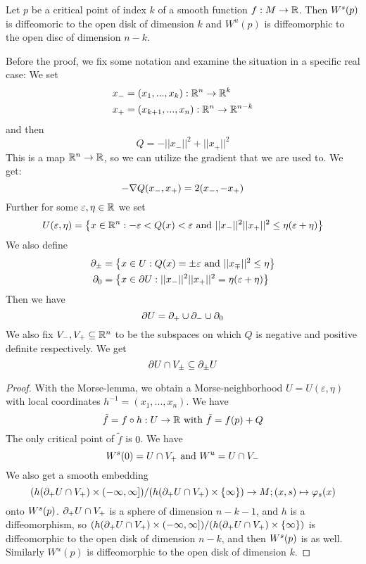 \begin{prop}
    Let $p$ be a critical point of index $k$ of a smooth function $f: M \to { \mathbb R }$. Then
    ${ W^s }(p)$ is diffeomoric to the open disk of dimension $k$ and $W^u(p)$ is diffeomorphic
    to the open disc of dimension $n - k$.
\end{prop}

\begin{definition}
    Before the proof, we fix some notation and examine the situation in a specific real case:
    We set 
    \begin{align*}
        x_- &= (x_1, ..., x_k) : { \mathbb R }^n \to { \mathbb R }^k \\
        x_+ &= (x_{k+1}, ..., x_n): { \mathbb R }^n \to { \mathbb R }^{n - k}
    \end{align*}
    and then
    \[ Q = - || x_- ||^2 + || x_+ ||^2 \]
    This is a map ${ \mathbb R }^n \to { \mathbb R }$, so we can utilize the gradient that we are used to. We get:
    \[ -{ \nabla } Q (x_-, x_+) = 2 (x_-, -x_+) \]
    Further for some $\varepsilon, \eta \in { \mathbb R }$ we set
    \[ U(\varepsilon, \eta) = \left\{ x \in { \mathbb R }^n : - \varepsilon < Q(x) < \varepsilon
    \text{ and } || x_- ||^2 || x_+ ||^2 \leq \eta(\varepsilon + \eta) \right\} \]
    We also define 
    \begin{align*}
        { \partial }_{\pm} &= \left\{ x \in U : Q(x) = \pm \varepsilon 
            \text{ and } || x_{\mp} ||^2 \leq \eta \right\} \\
        { \partial }_0 &= \left\{ x \in { \partial } U : || x_- ||^2 || x_+ ||^2 = \eta(\varepsilon + \eta) \right\} 
    \end{align*}
    Then we have
    \[ { \partial } U = { \partial }_+ \cup { \partial }_- \cup { \partial }_0 \]
    We also fix $V_-, V_+ \subseteq { \mathbb R }^n$ to be the subspaces on which $Q$ is negative and
    positive definite respectively.  We get 
    \[ { \partial } U \cap V_{\pm} \subseteq { \partial }_{\pm} U \]
\end{definition}

\begin{proof}
    With the Morse-lemma, we obtain a Morse-neighborhood $U = U(\varepsilon, \eta)$ 
    with local coordinates $h^{-1} = (x_1, ..., x_n)$. We have
    \[ \tilde{f} = f \circ h : U \to { \mathbb R } \text{ with } \tilde{f} = f(p) + Q \]
    The only critical point of $\tilde{f}$ is $0$. We have
    \[ { W^s }(0) = U \cap V_+ \text{ and } W^u = U \cap V_- \]
    We also get a smooth embedding
    \[ ( h({ \partial }_+ U \cap V_+) \times (-\infty, \infty]) /( h({ \partial }_+ U \cap V_+) \times \{ \infty \}) 
    \to M; (x, s) \mapsto \varphi_s(x) \] 
    onto ${ W^s }(p)$.
    ${ \partial }_+ U \cap V_+$ is a sphere of dimension $n - k - 1$, and $h$ is a diffeomorphism,
    so $( h({ \partial }_+ U \cap V_+) \times (-\infty, \infty]) /( h({ \partial }_+ U \cap V_+) \times \{ \infty \})$
    is diffeomorphic to the open disk of dimension $n - k$, and then ${ W^s }(p)$ is as well.
    Similarly $W^u(p)$ is diffeomorphic to the open disk of dimension $k$.
\end{proof}

